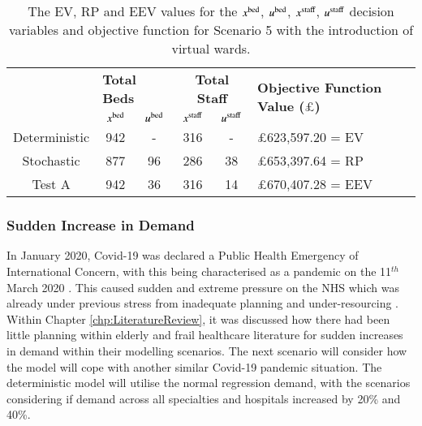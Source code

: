 \documentclass[../thesis.tex]{subfiles}
\begin{document}
\begin{table}[h!]
    \centering
    \begin{tabular}{cccccl}\toprule
 & \multicolumn{2}{l}{\textbf{Total Beds}} & \multicolumn{2}{c}{\textbf{Total Staff}} & \multirow{2}{*}{\textbf{Objective Function Value ($\pounds$)}}\\ \cmidrule(lr){2-3} \cmidrule(lr){4-5}
         
 & $x^\textnormal{bed}$           & $u^\textnormal{bed}$          & $x^\textnormal{staff}$         & $u^\textnormal{staff}$         \\ \midrule
 Deterministic & 942  & - & 316 & - &$\pounds$623,597.20 = EV \\
 Stochastic &877  &96  & 286 & 38 & $\pounds$653,397.64 = RP \\
 Test A & 942 & 36 & 316 & 14 & $\pounds$670,407.28 = EEV \\\bottomrule
    \end{tabular}
    \caption{The EV, RP and EEV values for the $x^\textnormal{bed}$, $u^\textnormal{bed}$, $x^\textnormal{staff}$, $u^\textnormal{staff}$ decision variables and objective function for Scenario 5 with the introduction of virtual wards.}
    \label{tab:Scenario6Results}
\end{table}

\subsubsection{Sudden Increase in Demand}

In January 2020, Covid-19 was declared a Public Health Emergency of International Concern, with this being characterised as a pandemic on the 11$^{th}$ March 2020 \cite{WHO2023}. This caused sudden and extreme pressure on the NHS which was already under previous stress from inadequate planning and under-resourcing \cite{BMA2022}. Within Chapter \ref{chp:LiteratureReview}, it was discussed how there had been little planning within elderly and frail healthcare literature for sudden increases in demand within their modelling scenarios. The next scenario will consider how the model will cope with another similar Covid-19 pandemic situation. The deterministic model will utilise the normal regression demand, with the scenarios considering if demand across all specialties and hospitals increased by 20\% and 40\%.
\end{document}
